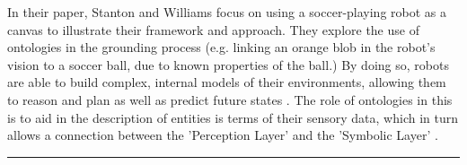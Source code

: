 \documentclass[a4paper,9pt]{scrartcl}
\begin{document}
In their paper, Stanton and Williams focus on using a soccer-playing robot as a canvas to illustrate their framework and approach. They explore the
use of ontologies in the grounding process (e.g. linking an orange blob in the robot's vision to a soccer ball, due to known properties of the ball.) By doing so, robots are
able to build complex, internal models of their environments, allowing them to reason and plan as well as predict future states \cite{stantonGroundingRobotSensory2004}.
The role of ontologies in this is to aid in the description of entities is terms of their sensory data, which in turn allows a connection between the 'Perception Layer' and 
the 'Symbolic Layer' \cite{stantonGroundingRobotSensory2004}.





\rule{\linewidth}{0.2mm}



\end{document}
